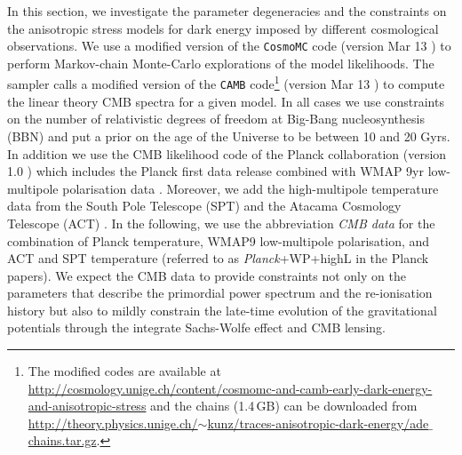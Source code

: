 In this section, we investigate the parameter degeneracies and the constraints on the anisotropic stress models for dark energy imposed by different cosmological observations. We use a modified version of the {\tt CosmoMC} code (version Mar 13 \cite{Lewis:2002ah,Cosmomc}) to perform Markov-chain Monte-Carlo explorations of the model likelihoods. The sampler calls a modified version of the {\tt CAMB} code\footnote{The modified codes are available at \href{http://cosmology.unige.ch/content/cosmomc-and-camb-early-dark-energy-and-anisotropic-stress}{http://cosmology.unige.ch/content/cosmomc-and-camb-early-dark-energy-and-anisotropic-stress} and the chains (1.4\,GB) can be downloaded from \href{http://theory.physics.unige.ch/~kunz/traces-anisotropic-dark-energy/ade_chains.tar.gz}{http://theory.physics.unige.ch/$ \sim $kunz/traces-anisotropic-dark-energy/ade$\_$chains.tar.gz}.} (version Mar 13 \cite{Lewis:1999bs,Camb}) to compute the linear theory CMB spectra for a given model. 
In all cases we use constraints on the number of relativistic degrees of freedom at Big-Bang nucleosynthesis (BBN) \cite{Pisanti:2007hk} and put a prior on the age of the Universe to be between 10 and 20 Gyrs. In addition we use the CMB likelihood code of the Planck collaboration (version 1.0 \cite{Planck:2013kta,Ade:2013zuv}) which includes the Planck first data release combined with WMAP 9yr low-multipole polarisation data \cite{Bennett:2012fp}. Moreover, we add the high-multipole temperature data from the South Pole Telescope (SPT) \cite{Story:2012wx} and the Atacama Cosmology Telescope (ACT) \cite{Das:2013zf}. In the following, we use the abbreviation \emph{CMB data} for the combination of Planck temperature, WMAP9 low-multipole polarisation, and ACT and SPT temperature  (referred to as \emph{Planck}+WP+highL in the Planck papers). We expect the CMB data to provide constraints not only on the parameters that describe the primordial power spectrum and the re-ionisation history but also to mildly constrain the late-time evolution of the gravitational potentials through the integrate Sachs-Wolfe effect and CMB lensing. 


